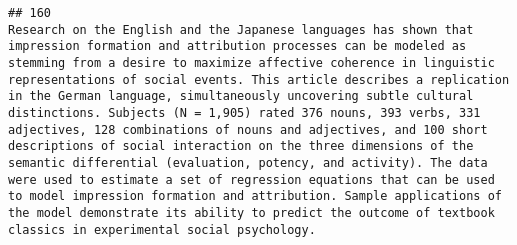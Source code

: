 \documentclass[
  english,
  man]{apa6}
\begin{document}
\begin{verbatim}
## 160                                                                                                                                                                                                                                                                                                                                                                                                                                                                                                                                                                                                                                                                                                                                                                                                                                                                                                                                                                                                                                                                                                                                                                                                                                                                                                                                                                                                                                                                                                                                                                                                                                                                                                                                                                                Research on the English and the Japanese languages has shown that impression formation and attribution processes can be modeled as stemming from a desire to maximize affective coherence in linguistic representations of social events. This article describes a replication in the German language, simultaneously uncovering subtle cultural distinctions. Subjects (N = 1,905) rated 376 nouns, 393 verbs, 331 adjectives, 128 combinations of nouns and adjectives, and 100 short descriptions of social interaction on the three dimensions of the semantic differential (evaluation, potency, and activity). The data were used to estimate a set of regression equations that can be used to model impression formation and attribution. Sample applications of the model demonstrate its ability to predict the outcome of textbook classics in experimental social psychology.

\end{verbatim}
\end{document}
